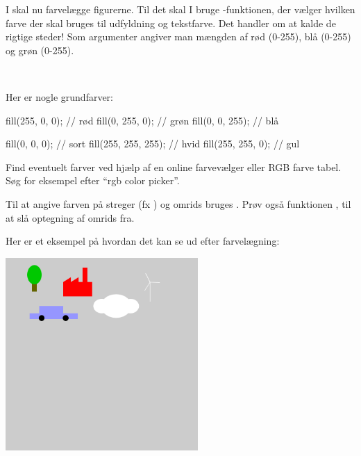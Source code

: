 \documentclass{ucph-handout}
\begin{document}
\begin{exercisebox}[adjusted title=Farver]
I skal nu farvelægge figurerne. Til det skal I bruge
-funktionen, der vælger hvilken farve der skal
bruges til udfyldning og tekstfarve. Det handler om at kalde
 de rigtige steder! Som argumenter angiver man mængden
af rød (0-255), blå (0-255) og grøn (0-255).

~

\noindent
Her er nogle grundfarver:

\begin{minipage}{0.45\linewidth}
\begin{javascript}
fill(255, 0, 0);  // rød
fill(0, 255, 0);  // grøn
fill(0, 0, 255);  // blå
\end{javascript}
\end{minipage}
\begin{minipage}{0.45\linewidth}
\begin{javascript}
fill(0, 0, 0);       // sort
fill(255, 255, 255); // hvid
fill(255, 255, 0);   // gul
\end{javascript}
\end{minipage}

\noindent
Find eventuelt farver ved hjælp af en online farvevælger eller RGB
farve tabel. Søg for eksempel efter ``rgb color picker''.

Til at angive farven på streger (fx ) og omrids
bruges . Prøv også funktionen ,
til at slå optegning af omrids fra.
\end{exercisebox}

\newpage
\begin{exercisebox}[adjusted title=Eksempel]
Her er et eksempel på hvordan det kan se ud efter farvelægning:
\begin{center}
\includegraphics[width=0.55\textwidth]{../illustrations/images/farvelagt.png}
\end{center}
\end{exercisebox}
\end{document}
